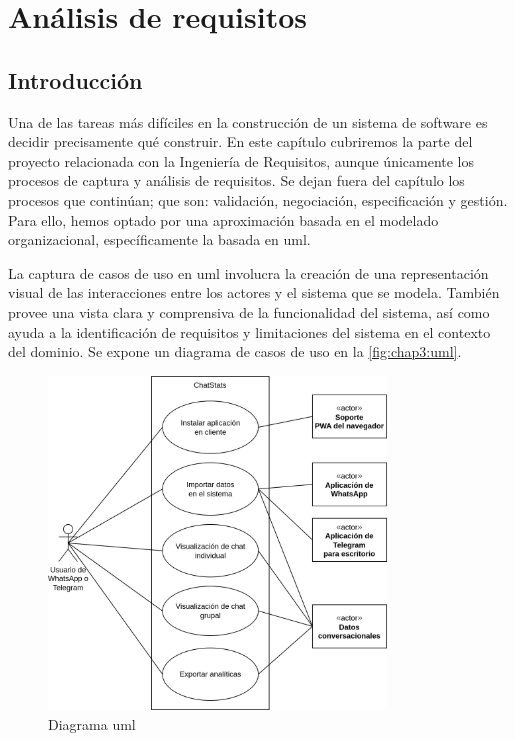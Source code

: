 \chapter{Análisis de requisitos}
\label{chap:use-case}

\section{Introducción}
\label{chap3:introduction}

Una de las tareas más difíciles en la construcción de un sistema de software es decidir precisamente qué construir. En este capítulo cubriremos la parte del proyecto relacionada con la Ingeniería de Requisitos, aunque únicamente los procesos de captura y análisis de requisitos. Se dejan fuera del capítulo los procesos que continúan; que son: validación, negociación, especificación y gestión. Para ello, hemos optado por una aproximación basada en el modelado organizacional, específicamente la basada en \acrfull{uml}.

La captura de casos de uso en \acrshort{uml} involucra la creación de una representación visual de las interacciones entre los actores y el sistema que se modela. También provee una vista clara y comprensiva de la funcionalidad del sistema, así como ayuda a la identificación de requisitos y limitaciones del sistema en el contexto del dominio. Se expone un diagrama de casos de uso en la \autoref{fig:chap3:uml}.


\begin{figure}[H]
	\centering
	\includegraphics[width=0.8\textwidth]{img/uml.png}
	\caption{Diagrama \acrshort{uml}}
	\label{fig:chap3:uml}
\end{figure}


